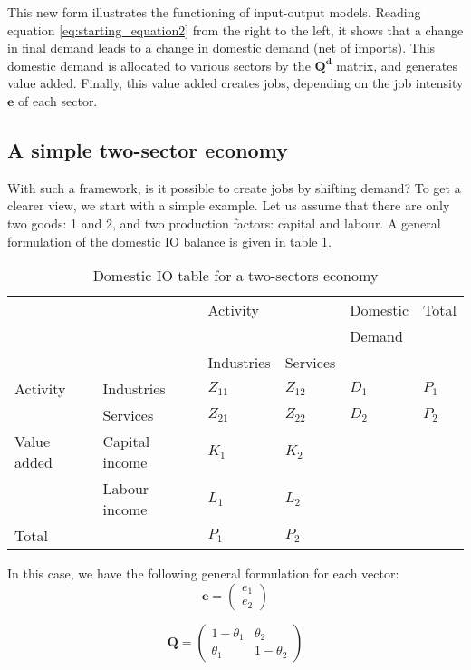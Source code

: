 This new form illustrates the functioning of input-output models. Reading equation \ref{eq:starting_equation2} from the right to the left, it shows that a change in final demand leads to a change in domestic demand (net of imports). This domestic demand is allocated to various sectors by the $\pmb{Q^d}$ matrix, and generates value added. Finally, this value added creates jobs, depending on the job intensity $\pmb{e}$ of each sector. 

\subsection{A simple two-sector economy}
With such a framework, is it possible to create jobs by shifting demand? 
To get a clearer view, we start with a simple example. Let us assume that there are only two goods: 1 and 2, and two production factors: capital and labour. 
A general formulation of the domestic IO balance is given in table \ref{tab:2x2_IO_table}.

\begin{table}
	\centering
	\caption{Domestic IO table for a two-sectors economy}
	\label{tab:2x2_IO_table}
	\begin{tabular}{llllll}
		\toprule
		&  & Activity &  & Domestic & Total \\
		&  & &  & Demand & \\
		\midrule
		&  & Industries & Services &  &  \\
		Activity & Industries & $Z_{11}$ & $Z_{12}$ & $D_1$ & $P_1$ \\
		& Services & $Z_{21}$ & $Z_{22}$ & $D_2$ & $P_2$ \\
		Value added & Capital income & $K_1$ & $K_2$ &  &  \\
		& Labour income & $L_1$ & $L_2$ &  &  \\
		Total &  & $P_1$ & $P_2$ &  &  \\
		\bottomrule 
	\end{tabular}
\end{table}

In this case, we have the following general formulation for each vector:
$$ \pmb{e} =
\begin{pmatrix} 
e_1 \\
e_2
\end{pmatrix}
$$

$$ \pmb{Q} =
\begin{pmatrix} 
1-\theta_1 & \theta_2\\
\theta_1 & 1-\theta_2
\end{pmatrix}
$$

